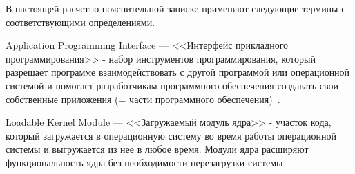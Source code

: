 
В настоящей расчетно-пояснительной записке применяют следующие термины с соответствующими определениями.\\

\begin{description}[leftmargin=0pt]
	\item \noindent Application Programming Interface --- <<Интерфейс прикладного программирования>> -
	набор инструментов программирования,
	который разрешает программе взаимодействовать с другой программой или операционной системой
	и помогает разработчикам программного обеспечения создавать свои собственные приложения
	(= части программного обеспечения)~\cite{API-definition}.\\
	\item \noindent Loadable Kernel Module --- <<Загружаемый модуль ядра>> -
	участок кода, который загружается в операционную систему во время работы операционной системы
	и выгружается из нее в любое время.
	Модули ядра расширяют функциональность ядра без необходимости перезагрузки системы~\cite{LKM-definition}.
\end{description}
